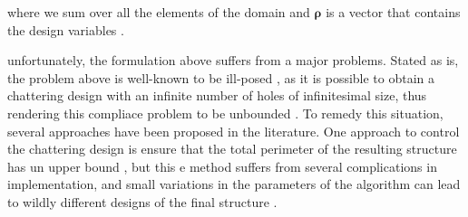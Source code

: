 \documentclass[../main.tex]{subfiles}
\begin{document}
where we sum over all the elements of the domain and $\bm{\rho}$ is a vector that contains the design variables \cite{lazarovFiltersTopologyOptimization2011}. 

unfortunately, the formulation above suffers from a major problems. Stated as is, the problem above is well-known to be ill-posed \cite{kohnOptimalDesignRelaxation1986}, as it is possible to obtain a chattering design with an infinite number of holes of infinitesimal size, thus rendering this compliace problem to be unbounded \cite{liuEfficient3DTopology2014}. To remedy this situation, several approaches have been proposed in the literature. One approach to control the chattering design is ensure that the total perimeter of the resulting structure has un upper bound \cite{haberNewApproachVariabletopology1996} \cite{jogTopologyDesignStructures2002}, but this e method suffers from several complications in implementation, and small variations in the parameters of the algorithm can lead to wildly different designs of the final structure \cite{jogTopologyDesignStructures2002}.
\end{document}
